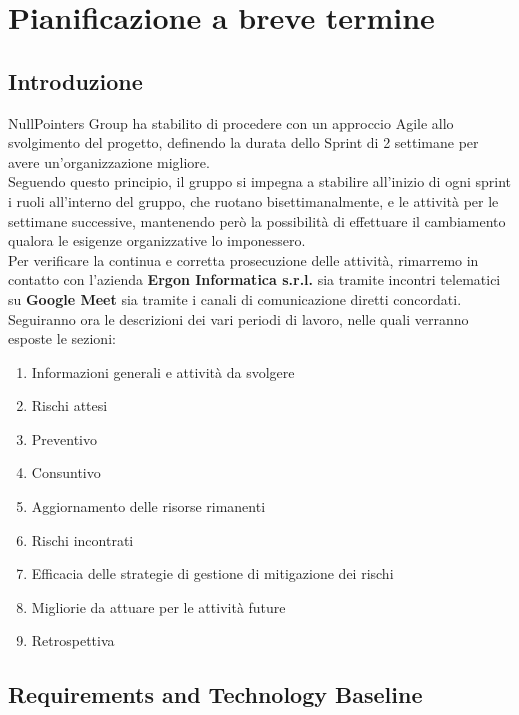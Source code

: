 \section{Pianificazione a breve termine}

\subsection{Introduzione}
NullPointers Group ha stabilito di procedere con un approccio Agile allo svolgimento del progetto, definendo la durata dello Sprint di 2 settimane per avere un'organizzazione migliore.\\
Seguendo questo principio, il gruppo si impegna a stabilire all’inizio di ogni sprint i ruoli all'interno del gruppo, che ruotano bisettimanalmente, e le attività per le settimane successive, mantenendo però la possibilità di effettuare il cambiamento qualora le esigenze organizzative lo imponessero.\\
Per verificare la continua e corretta prosecuzione delle attività, rimarremo in contatto con l'azienda \textbf{Ergon Informatica s.r.l.} sia tramite incontri telematici su \textbf{Google Meet} sia tramite i canali di comunicazione diretti concordati.\\
Seguiranno ora le descrizioni dei vari periodi di lavoro, nelle quali verranno esposte le sezioni:
\begin{enumerate}
	\item Informazioni generali e attività da svolgere
	\item Rischi attesi
	\item Preventivo
	\item Consuntivo
	\item Aggiornamento delle risorse rimanenti
	\item Rischi incontrati
	\item Efficacia delle strategie di gestione di mitigazione dei rischi
	\item Migliorie da attuare per le attività future
	\item Retrospettiva
\end{enumerate}

\newpage
\subsection{Requirements and Technology Baseline}



\newpage


\newpage


\newpage


\newpage


\newpage


\newpage
